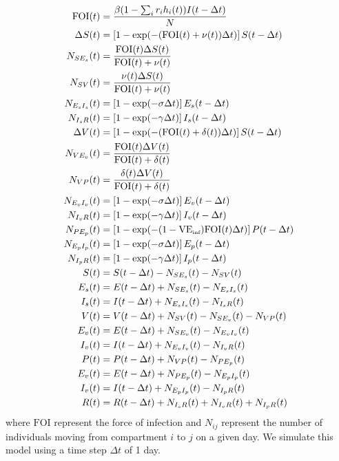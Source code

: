 \documentclass[12pt]{article}
\begin{document}
\begin{align}
\textrm{FOI}(t) &= \frac{\beta (1 - \sum_i r_i h_i(t)) I(t-\Delta t)}{N}\\
\Delta S(t) &= \left[1- \exp(-(\textrm{FOI}(t) + \nu(t)) \Delta t )\right] S(t-\Delta t)\\
N_{SE_s}(t) &= \frac{\textrm{FOI}(t)\Delta S(t)}{\textrm{FOI}(t) + \nu(t)} \\
N_{SV}(t) &= \frac{\nu(t)\Delta S(t)}{\textrm{FOI}(t) + \nu(t)} \\
N_{E_sI_s}(t) &= \left[1- \exp(-\sigma \Delta t )\right] E_s(t-\Delta t)\\
N_{I_sR}(t) &= \left[1- \exp(-\gamma \Delta t )\right] I_s(t-\Delta t)\\
\Delta V(t) &= \left[1- \exp(-(\textrm{FOI}(t) + \delta(t)) \Delta t )\right] S(t-\Delta t)\\
N_{VE_v}(t) &= \frac{\textrm{FOI}(t)\Delta V(t)}{\textrm{FOI}(t) + \delta(t)} \\
N_{VP}(t) &= \frac{\delta(t)\Delta V(t)}{\textrm{FOI}(t) + \delta(t)} \\
N_{E_vI_v}(t) &= \left[1- \exp(-\sigma \Delta t )\right] E_v(t-\Delta t)\\
N_{I_vR}(t) &= \left[1- \exp(-\gamma \Delta t )\right] I_v(t-\Delta t)\\
N_{PE_p}(t) &= \left[1-\exp(-(1-\mathrm{VE}_{\textrm{\tiny{inf}}})\textrm{FOI}(t) \Delta t)\right] P(t-\Delta t)  \\
N_{E_pI_p}(t) &= \left[1- \exp(-\sigma \Delta t )\right] E_p(t-\Delta t)\\
N_{I_pR}(t) &= \left[1- \exp(-\gamma \Delta t )\right] I_p(t-\Delta t)\\
S(t) &= S(t-\Delta t) - N_{SE_s}(t) - N_{SV}(t)\\
E_s(t) &= E(t-\Delta t) + N_{SE_s}(t) - N_{E_sI_s}(t)\\
I_s(t) &= I(t-\Delta t) + N_{E_sI_s}(t) - N_{I_sR}(t)\\
V(t) &= V(t-\Delta t) + N_{SV}(t) - N_{SE_v}(t) - N_{VP}(t)\\
E_v(t) &= E(t-\Delta t) + N_{SE_v}(t) - N_{E_vI_v}(t)\\
I_v(t) &= I(t-\Delta t) + N_{E_vI_v}(t) - N_{I_vR}(t)\\
P(t) &= P(t-\Delta t) + N_{VP}(t) - N_{PE_p}(t)\\
E_v(t) &= E(t-\Delta t) + N_{PE_p}(t) - N_{E_pI_p}(t)\\
I_v(t) &= I(t-\Delta t) + N_{E_pI_p}(t) - N_{I_pR}(t)\\
R(t) &= R(t-\Delta t) + N_{I_sR}(t) + N_{I_vR}(t) + N_{I_pR}(t)
\end{align}
where $\textrm{FOI}$ represent the force of infection and $N_{ij}$ represent the number of individuals moving from compartment $i$ to $j$ on a given day. We simulate this model using a time step $\Delta t$ of 1 day.
\end{document}
